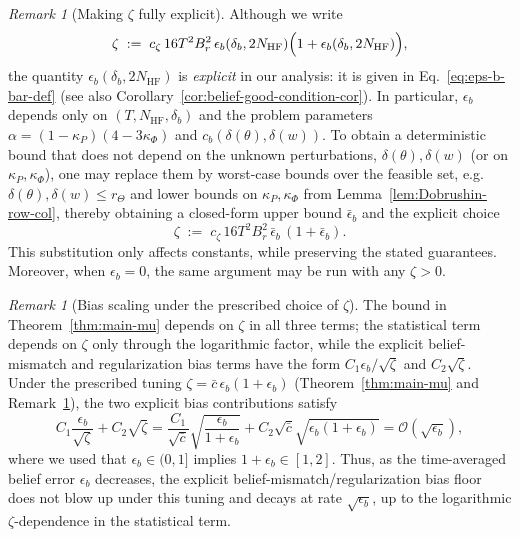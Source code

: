 \documentclass[10pt]{article} %
\theoremstyle{plain}
\theoremstyle{definition}
\theoremstyle{remark}
\newtheorem{remark}[theorem]{Remark}
\begin{document}
\begin{remark}[Making $\zeta$ fully explicit]\label{rem:zeta-explicit}
Although we write
\[
\zeta \;:=\; c_{\zeta}\,16T^2B_r^2\,\epsilon_b(\delta_b,2N_{\mathrm{HF}})
\Bigl(1+\epsilon_b(\delta_b,2N_{\mathrm{HF}})\Bigr),
\]
the quantity $\epsilon_b(\delta_b,2N_{\mathrm{HF}})$ is \emph{explicit} in our analysis: it is given in
Eq.~\ref{eq:eps-b-bar-def} (see also Corollary~\ref{cor:belief-good-condition-cor}).
In particular, $\epsilon_b$ depends only on $(T,N_{\mathrm{HF}},\delta_b)$ and the problem parameters
$\alpha=(1-\kappa_P)(4-3\kappa_\Phi)$ and $c_b(\delta(\theta),\delta(w))$.
To obtain a deterministic bound that does not depend on the unknown perturbations,
$\delta(\theta),\delta(w)$ (or on $\kappa_P,\kappa_\Phi$), one may replace them by worst-case bounds
over the feasible set, e.g. $\delta(\theta),\delta(w)\le r_\Theta$ and
lower bounds on $\kappa_P,\kappa_\Phi$ from Lemma~\ref{lem:Dobrushin-row-col},
thereby obtaining a closed-form upper bound $\bar\epsilon_b$ and the explicit choice
\[
\zeta \;:=\; c_{\zeta}\,16T^2B_r^2\,\bar\epsilon_b\,(1+\bar\epsilon_b).
\]
This substitution only affects constants, while preserving the stated guarantees. Moreover, when \(\epsilon_b=0\), the same argument may be run with any \(\zeta>0\).
\end{remark}


\begin{remark}[Bias scaling under the prescribed choice of $\zeta$]\label{rem:zeta-choice}
The bound in Theorem~\ref{thm:main-mu} depends on $\zeta$ in all three terms; the statistical term depends on $\zeta$ only through the logarithmic factor, while the explicit belief-mismatch and regularization bias terms have the form
\(C_1\epsilon_b/\sqrt{\zeta}\) and \(C_2\sqrt{\zeta}\). Under the prescribed tuning
\(\zeta = \bar c\,\epsilon_b(1+\epsilon_b)\) (Theorem~\ref{thm:main-mu} and Remark~\ref{rem:zeta-explicit}),
the two explicit bias contributions satisfy
\[
C_1\frac{\epsilon_b}{\sqrt{\zeta}}+ C_2 \sqrt{\zeta}=\frac{C_1}{\sqrt{\bar c}}\sqrt{\frac{\epsilon_b}{1+\epsilon_b}}+C_2 \sqrt{\bar c}\sqrt{\epsilon_b(1+\epsilon_b)}=\mathcal O(\sqrt{\epsilon_b}),
\]
where we used that \(\epsilon_b\in(0,1]\) implies \(1+\epsilon_b\in[1,2]\). Thus, as the time-averaged belief error \(\epsilon_b\) decreases, the explicit belief-mismatch/regularization bias floor does not blow up under this tuning and decays at rate \(\sqrt{\epsilon_b}\), up to the logarithmic \(\zeta\)-dependence in the statistical term.
\end{remark}
\end{document}
